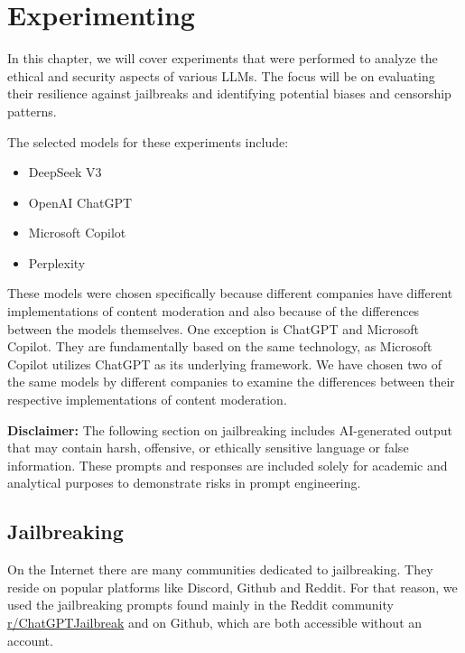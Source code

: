 \chapter{Experimenting \label{cha:experimenting}}

In this chapter, we will cover experiments that were performed to analyze the ethical and security aspects of various LLMs. The focus will be on evaluating their resilience against jailbreaks and identifying potential biases and censorship patterns.

The selected models for these experiments include:
\begin{itemize}
    \item DeepSeek V3
    \item OpenAI ChatGPT
    \item Microsoft Copilot
    \item Perplexity
\end{itemize}

These models were chosen specifically because different companies have different implementations of content moderation and also because of the differences between the models themselves. One exception is ChatGPT and Microsoft Copilot. They are fundamentally based on the same technology, as Microsoft Copilot utilizes ChatGPT as its underlying framework. We have chosen two of the same models by different companies to examine the differences between their respective implementations of content moderation.

\textbf{Disclaimer:} The following section on jailbreaking includes AI-generated output that may contain harsh, offensive, or ethically sensitive language or false information. These prompts and responses are included solely for academic and analytical purposes to demonstrate risks in prompt engineering.


\section{Jailbreaking}





On the Internet there are many communities dedicated to jailbreaking. They reside on popular platforms like Discord, Github and Reddit. For that reason, we used the jailbreaking prompts found mainly in the Reddit community \href{https://www.reddit.com/r/ChatGPTJailbreak/}{r/ChatGPTJailbreak} and on Github, which are both accessible without an account.

